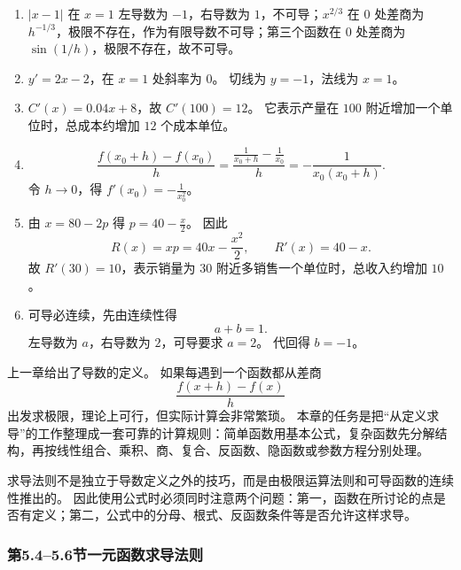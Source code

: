 \documentclass[fontset=fandol]{ctexart}
\begin{document}
\begin{enumerate}[label=\textbf{练习\arabic*.},leftmargin=2.2em]
\item $|x-1|$ 在 $x=1$ 左导数为 $-1$，右导数为 $1$，不可导；$x^{2/3}$ 在 $0$ 处差商为 $h^{-1/3}$，极限不存在，作为有限导数不可导；第三个函数在 $0$ 处差商为 $\sin(1/h)$，极限不存在，故不可导。
\item $y'=2x-2$，在 $x=1$ 处斜率为 $0$。 切线为 $y=-1$，法线为 $x=1$。
\item $C'(x)=0.04x+8$，故 $C'(100)=12$。 它表示产量在 $100$ 附近增加一个单位时，总成本约增加 $12$ 个成本单位。
\item
\[
\frac{f(x_0+h)-f(x_0)}{h}
=\frac{\frac1{x_0+h}-\frac1{x_0}}{h}
=-\frac1{x_0(x_0+h)}.
\]
令 $h\to0$，得 $f'(x_0)=-\frac1{x_0^2}$。
\item 由 $x=80-2p$ 得 $p=40-\frac{x}{2}$。 因此
\[
R(x)=xp=40x-\frac{x^2}{2},\qquad R'(x)=40-x.
\]
故 $R'(30)=10$，表示销量为 $30$ 附近多销售一个单位时，总收入约增加 $10$。
\item 可导必连续，先由连续性得
\[
a+b=1.
\]
左导数为 $a$，右导数为 $2$，可导要求 $a=2$。 代回得 $b=-1$。
\end{enumerate}

上一章给出了导数的定义。 如果每遇到一个函数都从差商
\[
\frac{f(x+h)-f(x)}{h}
\]
出发求极限，理论上可行，但实际计算会非常繁琐。 本章的任务是把“从定义求导”的工作整理成一套可靠的计算规则：简单函数用基本公式，复杂函数先分解结构，再按线性组合、乘积、商、复合、反函数、隐函数或参数方程分别处理。

求导法则不是独立于导数定义之外的技巧，而是由极限运算法则和可导函数的连续性推出的。 因此使用公式时必须同时注意两个问题：第一，函数在所讨论的点是否有定义；第二，公式中的分母、根式、反函数条件等是否允许这样求导。

\subsubsection*{第5.4--5.6节\quad 一元函数求导法则}
\end{document}
